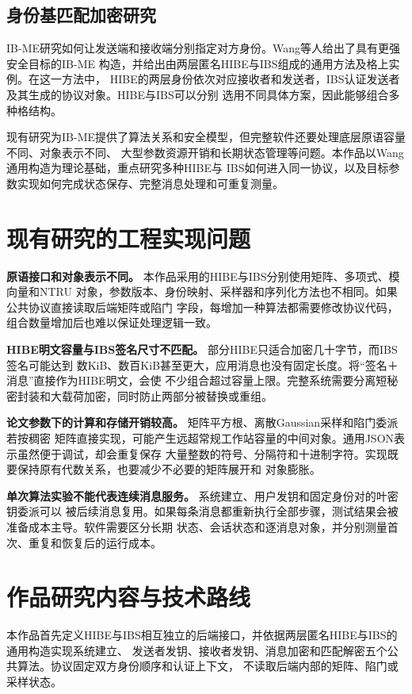 \subsection{身份基匹配加密研究}

IB-ME研究如何让发送端和接收端分别指定对方身份。Wang等人给出了具有更强安全目标的IB-ME
构造，并给出由两层匿名HIBE与IBS组成的通用方法及格上实例\cite{wang2024ibme}。在这一方法中，
HIBE的两层身份依次对应接收者和发送者，IBS认证发送者及其生成的协议对象。HIBE与IBS可以分别
选用不同具体方案，因此能够组合多种格结构。

现有研究为IB-ME提供了算法关系和安全模型，但完整软件还要处理底层原语容量不同、对象表示不同、
大型参数资源开销和长期状态管理等问题。本作品以Wang通用构造为理论基础，重点研究多种HIBE与
IBS如何进入同一协议，以及目标参数实现如何完成状态保存、完整消息处理和可重复测量。

\section{现有研究的工程实现问题}

\textbf{原语接口和对象表示不同。} 本作品采用的HIBE与IBS分别使用矩阵、多项式、模向量和NTRU
对象，参数版本、身份映射、采样器和序列化方法也不相同。如果公共协议直接读取后端矩阵或陷门
字段，每增加一种算法都需要修改协议代码，组合数量增加后也难以保证处理逻辑一致。

\textbf{HIBE明文容量与IBS签名尺寸不匹配。} 部分HIBE只适合加密几十字节，而IBS签名可能达到
数KiB、数百KiB甚至更大，应用消息也没有固定长度。将“签名＋消息”直接作为HIBE明文，会使
不少组合超过容量上限。完整系统需要分离短秘密封装和大载荷加密，同时防止两部分被替换或重组。

\textbf{论文参数下的计算和存储开销较高。} 矩阵平方根、离散Gaussian采样和陷门委派若按稠密
矩阵直接实现，可能产生远超常规工作站容量的中间对象。通用JSON表示虽然便于调试，却会重复保存
大量整数的符号、分隔符和十进制字符。实现既要保持原有代数关系，也要减少不必要的矩阵展开和
对象膨胀。

\textbf{单次算法实验不能代表连续消息服务。} 系统建立、用户发钥和固定身份对的叶密钥委派可以
被后续消息复用。如果每条消息都重新执行全部步骤，测试结果会被准备成本主导。软件需要区分长期
状态、会话状态和逐消息对象，并分别测量首次、重复和恢复后的运行成本。

\section{作品研究内容与技术路线}

本作品首先定义HIBE与IBS相互独立的后端接口，并依据两层匿名HIBE与IBS的通用构造实现系统建立、
发送者发钥、接收者发钥、消息加密和匹配解密五个公共算法。协议固定双方身份顺序和认证上下文，
不读取后端内部的矩阵、陷门或采样状态。

